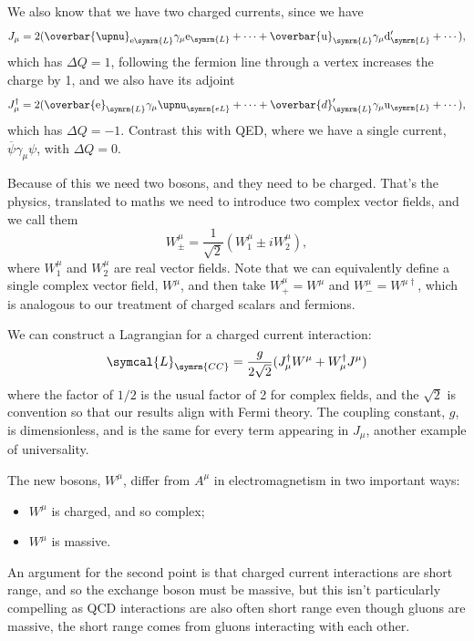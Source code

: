 \documentclass[fleqn]{NotesClass}
\newcommand{\Pparticle}[1]{\mathrm{#1}}
\newcommand{\Pu}{\ensuremath{\Pparticle{u}}}
\newcommand{\Pd}{\ensuremath{\Pparticle{d}}}
\newcommand{\Pex}{\ensuremath{\Pparticle{e}}}
\newcommand{\Pnu}{\ensuremath{\upnu}}
\newcommand{\PnueLeft}{\ensuremath{\upnu_{\symrm{eL}}}}
\newcommand{\diracadjoint}[1]{\overbar{#1}}
\newcommand{\hermit}{\dagger}
\newcommand{\lagrangianDensity}{\symcal{L}}
\newcommand{\Left}{\symrm{L}}
\begin{document}
    We also know that we have two charged currents, since we have
    \begin{equation}
        J_\mu = 2(\diracadjoint{\Pnu}_{\Pex\Left} \gamma_\mu \Pex_{\Left} + \dotsb + \diracadjoint{\Pu}_{\Left} \gamma_\mu \Pd'_{\Left} + \dotsb),
    \end{equation}
    which has \(\Delta Q = 1\), following the fermion line through a vertex increases the charge by 1, and we also have its adjoint
    \begin{equation}
        J_\mu^\hermit = 2(\diracadjoint{\Pex}_{\Left} \gamma_\mu \PnueLeft + \dotsb + \diracadjoint{d}'_{\Left} \gamma_\mu \Pu_{\Left} + \dotsb),
    \end{equation}
    which has \(\Delta Q = -1\).
    Contrast this with QED, where we have a single current, \(\diracadjoint{\psi}\gamma_\mu\psi\), with \(\Delta Q = 0\).
    
    Because of this we need two bosons, and they need to be charged.
    That's the physics, translated to maths we need to introduce two complex vector fields, and we call them
    \begin{equation}
        W_{\pm}^\mu = \frac{1}{\sqrt{2}}(W_1^\mu \pm i W_2^\mu),
    \end{equation}
    where \(W_1^\mu\) and \(W_2^\mu\) are real vector fields.
    Note that we can equivalently define a single complex vector field, \(W^\mu\), and then take \(W_+^\mu = W^\mu\) and \(W_-^\mu = W^{\mu\hermit}\), which is analogous to our treatment of charged scalars and fermions.
    
    We can construct a Lagrangian for a charged current interaction:
    \begin{equation}
        \lagrangianDensity_{\symrm{CC}} = \frac{g}{2\sqrt{2}}(J_\mu^\hermit W^\mu + W_\mu^\hermit J^\mu)
    \end{equation}
    where the factor of \(1/2\) is the usual factor of 2 for complex fields, and the \(\sqrt{2}\) is convention so that our results align with Fermi theory.
    The coupling constant, \(g\), is dimensionless, and is the same for every term appearing in \(J_\mu\), another example of universality.
    
    The new bosons, \(W^\mu\), differ from \(A^\mu\) in electromagnetism in two important ways:
    \begin{itemize}
        \item \(W^\mu\) is charged, and so complex;
        \item \(W^\mu\) is massive.
    \end{itemize}
    An argument for the second point is that charged current interactions are short range, and so the exchange boson must be massive, but this isn't particularly compelling as QCD interactions are also often short range even though gluons are massive, the short range comes from gluons interacting with each other.
    
\end{document}
